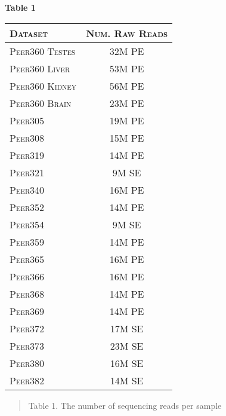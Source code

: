 \documentclass[11pt]{article}
\begin{document}
\vspace{10mm}
\textbf{\hypertarget{Table 1}{Table 1}} \\
\begin{center}
\begin{tabular}{l|c }
\textsc{Dataset}& \textsc{Num. Raw Reads} \\
\hline 
\textsc{Peer360 Testes} & 32M PE  \\
\textsc{Peer360 Liver} & 53M PE   \\
\textsc{Peer360 Kidney} & 56M PE   \\
\textsc{Peer360 Brain}  & 23M PE \\
\textsc{Peer305}  & 19M PE  \\
\textsc{Peer308}  & 15M PE  \\
\textsc{Peer319}  & 14M PE  \\
\textsc{Peer321}  & 9M SE  \\
\textsc{Peer340}  & 16M PE  \\
\textsc{Peer352}  & 14M PE  \\
\textsc{Peer354}  & 9M SE  \\
\textsc{Peer359}  & 14M PE  \\
\textsc{Peer365}  & 16M PE \\
\textsc{Peer366}  & 16M PE  \\
\textsc{Peer368}  & 14M PE  \\
\textsc{Peer369}  & 14M PE  \\
\textsc{Peer372}  & 17M SE  \\
\textsc{Peer373}  & 23M SE  \\
\textsc{Peer380}  & 16M SE  \\
\textsc{Peer382}  & 14M SE  \\
\end{tabular}
\begin{quote}
\small{Table 1. The number of sequencing reads per sample}
\end{quote}


\end{center}  


\vspace{5mm}
\end{document}
